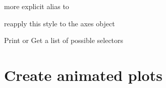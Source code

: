 \documentclass[letterpaper,10pt,openany,oneside,english]{sphinxmanual}
\begin{document}
\begin{fulllineitems}
\begin{fulllineitems}
\end{fulllineitems}


\begin{fulllineitems}
\label{\detokenize{config:config.Style.update_style}}
more explicit alias to 

\end{fulllineitems}


\begin{fulllineitems}
\label{\detokenize{config:config.Style.reapply}}
reapply this style to the axes object

\end{fulllineitems}


\begin{fulllineitems}
\label{\detokenize{config:config.Style.selectors}}
Print or Get a list of possible selectors

\end{fulllineitems}


\end{fulllineitems}

\label{\detokenize{animation:module-animation}}

\chapter{Create animated plots}
\label{\detokenize{animation:animation}}\label{\detokenize{animation::doc}}\label{\detokenize{animation:create-animated-plots}}
\end{document}
